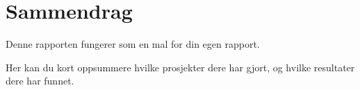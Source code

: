 \documentclass[./main.tex]{subfiles}
\begin{document}
\chapter*{Sammendrag}\label{kap:sammendrag}

Denne rapporten fungerer som en mal for din egen rapport.

Her kan du kort oppsummere hvilke prosjekter dere har gjort, og
hvilke resultater dere har funnet.
\end{document}
